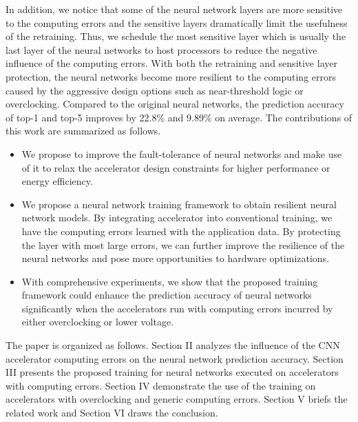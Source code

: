 In addition, we notice that some of the neural network layers are more sensitive to the 
computing errors and the sensitive layers dramatically limit the usefulness of the retraining. 
Thus, we schedule the most sensitive layer which is usually the last 
layer of the neural networks to host processors to reduce the negative influence 
of the computing errors. With both the retraining and sensitive layer protection, 
the neural networks become more resilient to the computing errors caused by 
the aggressive design options such as near-threshold logic or overclocking.
Compared to the original neural networks, the prediction accuracy of top-1 and top-5 
improves by 22.8\% and 9.89\% on average. The contributions of this work are 
summarized as follows.

\begin{itemize}
	\item We propose to improve the fault-tolerance of neural networks and make use of it to relax 
		the accelerator design constraints for higher performance or energy efficiency.

	\item We propose a neural network training framework to obtain resilient neural network models. 
		By integrating accelerator into conventional training, we have the computing errors 
		learned with the application data. By protecting the layer with most large errors, 
		we can further improve the resilience of the neural networks and pose more 
		opportunities to hardware optimizations.

	\item With comprehensive experiments, we show that the proposed training framework 
		could enhance the prediction accuracy of neural networks significantly 
		when the accelerators run with computing errors incurred by either 
		overclocking or lower voltage.
\end{itemize}
The paper is organized as follows. Section II analyzes the influence of 
the CNN accelerator computing errors on the neural network prediction accuracy. 
Section III presents the proposed training for neural networks executed on accelerators with computing errors.
Section IV demonstrate the use of the training on accelerators with overclocking and generic computing errors. 
Section V briefs the related work and Section VI draws the conclusion. 


